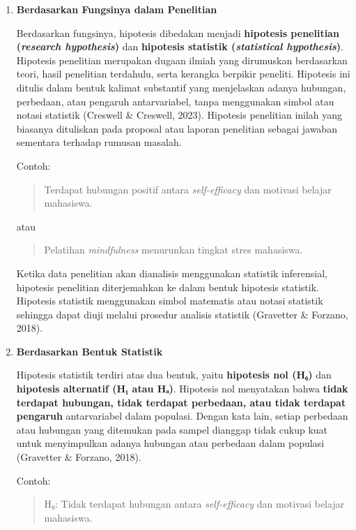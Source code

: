 \documentclass[
  indonesian,
  letterpaper,
  DIV=11,
  numbers=noendperiod]{scrreprt}
\begin{document}
\begin{enumerate}
\def\labelenumi{\arabic{enumi}.}
\item
  \textbf{Berdasarkan Fungsinya dalam Penelitian}

  Berdasarkan fungsinya, hipotesis dibedakan menjadi \textbf{hipotesis
  penelitian (\emph{research hypothesis})} dan \textbf{hipotesis
  statistik (\emph{statistical hypothesis})}. Hipotesis penelitian
  merupakan dugaan ilmiah yang dirumuskan berdasarkan teori, hasil
  penelitian terdahulu, serta kerangka berpikir peneliti. Hipotesis ini
  ditulis dalam bentuk kalimat substantif yang menjelaskan adanya
  hubungan, perbedaan, atau pengaruh antarvariabel, tanpa menggunakan
  simbol atau notasi statistik (Creswell \& Creswell, 2023). Hipotesis
  penelitian inilah yang biasanya dituliskan pada proposal atau laporan
  penelitian sebagai jawaban sementara terhadap rumusan masalah.

  Contoh:

  \begin{quote}
  Terdapat hubungan positif antara \emph{self-efficacy} dan motivasi
  belajar mahasiswa.
  \end{quote}

  atau

  \begin{quote}
  Pelatihan \emph{mindfulness} menurunkan tingkat stres mahasiswa.
  \end{quote}

  Ketika data penelitian akan dianalisis menggunakan statistik
  inferensial, hipotesis penelitian diterjemahkan ke dalam bentuk
  hipotesis statistik. Hipotesis statistik menggunakan simbol matematis
  atau notasi statistik sehingga dapat diuji melalui prosedur analisis
  statistik (Gravetter \& Forzano, 2018).
\item
  \textbf{Berdasarkan Bentuk Statistik}

  Hipotesis statistik terdiri atas dua bentuk, yaitu \textbf{hipotesis
  nol (H₀)} dan \textbf{hipotesis alternatif (H₁ atau Hₐ)}. Hipotesis
  nol menyatakan bahwa \textbf{tidak terdapat hubungan, tidak terdapat
  perbedaan, atau tidak terdapat pengaruh} antarvariabel dalam populasi.
  Dengan kata lain, setiap perbedaan atau hubungan yang ditemukan pada
  sampel dianggap tidak cukup kuat untuk menyimpulkan adanya hubungan
  atau perbedaan dalam populasi (Gravetter \& Forzano, 2018).

  Contoh:

  \begin{quote}
  H₀: Tidak terdapat hubungan antara \emph{self-efficacy} dan motivasi
  belajar mahasiswa.
  \end{quote}


\end{enumerate}
\end{document}
